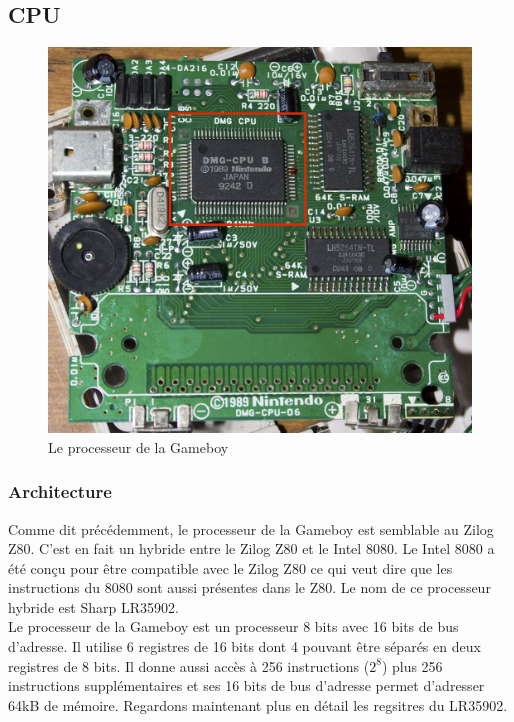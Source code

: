 \documentclass[a4paper]{article}
\begin{document}
\newpage


\subsection{CPU}

\begin{figure}[!h]
  \centering
  \includegraphics[scale=0.1]{images/cpu.jpg}
  \caption{Le processeur de la Gameboy}
\end{figure}

\subsubsection{Architecture}
Comme dit précédemment, le processeur de la Gameboy est semblable au Zilog Z80.
C'est en fait un hybride entre le Zilog Z80 et le Intel 8080. Le Intel 8080 a été
conçu pour être compatible avec le Zilog Z80 ce qui veut dire que les instructions
du 8080 sont aussi présentes dans le Z80. Le nom de ce processeur hybride est Sharp
LR35902. \\

Le processeur de la Gameboy est un processeur 8 bits avec 16 bits de bus d'adresse.
Il utilise 6 registres de 16 bits dont 4 pouvant être séparés en deux registres de
8 bits. Il donne aussi accès à 256 instructions ($2^{8}$) plus 256 instructions
supplémentaires et ses 16 bits de bus d'adresse permet d'adresser 64kB de mémoire.
Regardons maintenant plus en détail les regsitres du LR35902.
\end{document}
